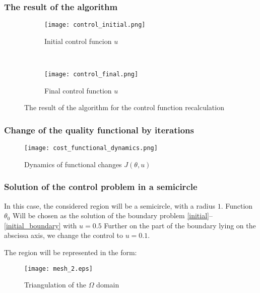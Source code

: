 \documentclass[9pt]{beamer}
\begin{document}
\begin{frame}
    \frametitle{The result of the algorithm}

    \begin{figure}
        \begin{subfigure}[b]{0.5\textwidth}
        \texttt{[image: control\_initial.png]}
        \caption{Initial control funcion $u$}
        \end{subfigure}%
        ~ %
        \begin{subfigure}[b]{0.5\textwidth}
        \texttt{[image: control\_final.png]}
        \caption{Final control function $u$}
        \end{subfigure}
        \caption{The result of the algorithm for the control function recalculation}
    \end{figure}

\end{frame}

\begin{frame}
\frametitle{Change of the quality functional by iterations}

\begin{figure}[H]
    \centering
    \texttt{[image: cost\_functional\_dynamics.png]}
    \caption{Dynamics of functional changes $J(\theta,u)$}
\end{figure}
\end{frame}

\begin{frame}
    \frametitle{Solution of the control problem in a semicircle}


    In this case, the considered region will be a semicircle, with a radius $1$. Function $\theta_0$ Will be chosen as the solution of the boundary problem \eqref{initial}--\eqref{initial_boundary} with $u = 0.5$
    Further on the part of the boundary lying on the abscissa axis, we change the control to $u = 0.1$.

    The region will be represented in the form:
    \begin{figure}[H]
        \centering
        \texttt{[image: mesh\_2.eps]}
        \caption{Triangulation of the $\Omega$ domain}
    \end{figure}

\end{frame}
\end{document}
